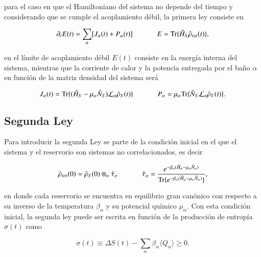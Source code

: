 para el caso en que el Hamiltoniano del sistema no depende del tiempo y considerando que se cumple el acoplamiento débil, la primera ley consiste en

\begin{equation*}
    \partial_{t}E(t) = \sum_{\alpha}[J_{\alpha}(t) + P_{\alpha}(t) ] \hspace{12mm} E = \text{Tr}\{\hat{H}_{S}\hat{\rho}_{tot}(t) \},
\end{equation*}

en el límite de acoplamiento débil $E(t)$ consiste en la energía interna del sistema, mientras que la corriente de calor y la potencia entregada por el baño $\alpha$ en función de la matriz densidad del sistema será 

\begin{equation*}
    J_{\alpha}(t) = \text{Tr}\{(\hat{H}_{S} - \mu_{\alpha}\hat{N}_S)\mathcal{L}_{\alpha}\hat{\rho}_{S}(t) \} \hspace{12mm} P_{\alpha} = \mu_{\alpha} \text{Tr}\{\hat{N}_{S}\mathcal{L}_{\alpha}\hat{\rho}_{S}(t) \}. 
\end{equation*}

\subsection{Segunda Ley}
Para introducir la segunda Ley se parte de la condición inicial en el que el sistema y el reservorio son sistemas no correlacionados, es decir 

\begin{equation*}
    \hat{\rho}_{tot}(0) = \hat{\rho}_{S}(0)\otimes_{\alpha}\hat{\tau}_{\alpha} \hspace{12mm} \hat{\tau}_{\alpha} = \frac{e^{-\beta_{\alpha}(\hat{H}_{\alpha}-\mu_{\alpha}\hat{N}_{\alpha}) }}{ \text{Tr}\{e^{-\beta_{\alpha}(\hat{H}_{\alpha} - \mu_{\alpha}\hat{N}_{\alpha})}\} },
\end{equation*}

en donde cada reservorio se encuentra en equilibrio gran canónico con respecto a su inverso de la temperatura $\beta_{\alpha}$ y su potencial químico $\mu_{\alpha}$. Con esta condición inicial, la segunda ley puede ser escrita en función de la producción de entropía $\sigma(t)$ como \cite{esposito2010entropy}

\begin{equation*}
    \sigma(t) \equiv \Delta S(t) - \sum_{\alpha}\beta_{\alpha}\langle Q_{\alpha}\rangle \geq 0.
\end{equation*}

